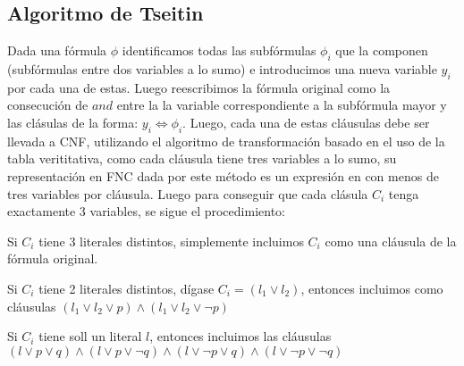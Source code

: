 \documentclass[article]{llncs}
\begin{document}
\subsection{Algoritmo de Tseitin}

Dada una fórmula $\phi $ identificamos todas las subfórmulas $\phi_i$ que la componen (subfórmulas entre dos variables a lo sumo) e introducimos una nueva variable 
$y_i$ por cada una de estas. Luego reescribimos la fórmula original como la consecución de $and$ entre la la variable correspondiente
a la subfórmula mayor y las clásulas de la forma: $ y_i \Leftrightarrow \phi_i$. Luego, cada una de estas cláusulas debe ser llevada
a CNF, utilizando el algoritmo de transformación basado en el uso de la tabla verititativa, como cada cláusula tiene tres variables a lo sumo, su representación
en FNC dada por este método es un expresión en con menos de tres variables por cláusula. Luego para conseguir que cada clásula $C_i$ tenga exactamente
3 variables, se sigue el procedimiento:

\bullet Si $C_i$ tiene 3 literales distintos, simplemente incluimos $C_i$ como una cláusula de la fórmula original.

\bullet Si $C_i$ tiene 2 literales distintos, dígase $C_i = (l_1 \vee  l_2)$, entonces incluimos como cláusulas
$(l_1\vee l_2\vee p)\wedge (l_1\vee l_2\vee \lnot p)$

\bullet Si $C_i$ tiene soll un literal $l$, entonces incluimos las cláusulas 
$(l\vee p\vee q)\wedge (l\vee p\vee \lnot q) \wedge (l\vee \lnot p \vee q)\wedge (l\vee \lnot p\vee \lnot q)$
\end{document}
